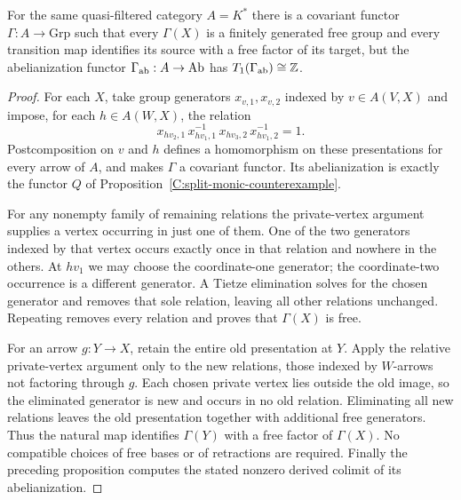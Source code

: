 \begin{corollary}\label{C:free-group-counterexample}
For the same quasi-filtered category $A=K^*$ there is a covariant
functor $\Gamma:A\to\mathrm{Grp}$ such that every $\Gamma(X)$ is a
finitely generated free group and every transition map identifies its
source with a free factor of its target, but the abelianization
functor $\Gamma_{\rm ab}:A\to\mathrm{Ab}$ has
$T_1(\Gamma_{\rm ab})\cong\mathbb Z$.
\end{corollary}
\begin{proof}
For each $X$, take group generators $x_{v,1},x_{v,2}$ indexed by
$v\in A(V,X)$ and impose, for each $h\in A(W,X)$, the relation
\[
 x_{hv_2,1}\,x_{hv_1,1}^{-1}\,
 x_{hv_3,2}\,x_{hv_1,2}^{-1}=1.
\]
Postcomposition on $v$ and $h$ defines a homomorphism on these
presentations for every arrow of $A$, and makes $\Gamma$ a covariant
functor. Its abelianization is exactly the functor $Q$ of
Proposition~\ref{C:split-monic-counterexample}.

For any nonempty family of remaining relations the private-vertex
argument supplies a vertex occurring in just one of them. One of the
two generators indexed by that vertex occurs exactly once in that
relation and nowhere in the others. At $hv_1$ we may choose the
coordinate-one generator; the coordinate-two occurrence is a different
generator. A Tietze elimination solves for the chosen generator and
removes that sole relation, leaving all other relations unchanged.
Repeating removes every relation and proves that $\Gamma(X)$ is free.

For an arrow $g:Y\to X$, retain the entire old presentation at $Y$.
Apply the relative private-vertex argument only to the new relations,
those indexed by $W$-arrows not factoring through $g$. Each chosen
private vertex lies outside the old image, so the eliminated generator
is new and occurs in no old relation. Eliminating all new relations
leaves the old presentation together with additional free generators.
Thus the natural map identifies $\Gamma(Y)$ with a free factor of
$\Gamma(X)$. No compatible choices of free bases or of retractions
are required. Finally the preceding proposition computes the stated
nonzero derived colimit of its abelianization.
\end{proof}
